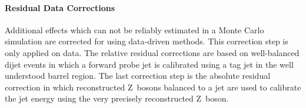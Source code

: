 \paragraph{Residual Data Corrections}

Additional effects which can not be reliably estimated in a Monte Carlo
simulation are corrected for using data-driven methods. This correction step is
only applied on data. The relative residual corrections are based on
well-balanced dijet events in which a forward probe jet is calibrated using a
tag jet in the well understood barrel region. The last correction step is the
absolute residual correction in which reconstructed Z~bosons balanced to a jet
are used to calibrate the jet energy using the very precisely reconstructed Z~boson.

